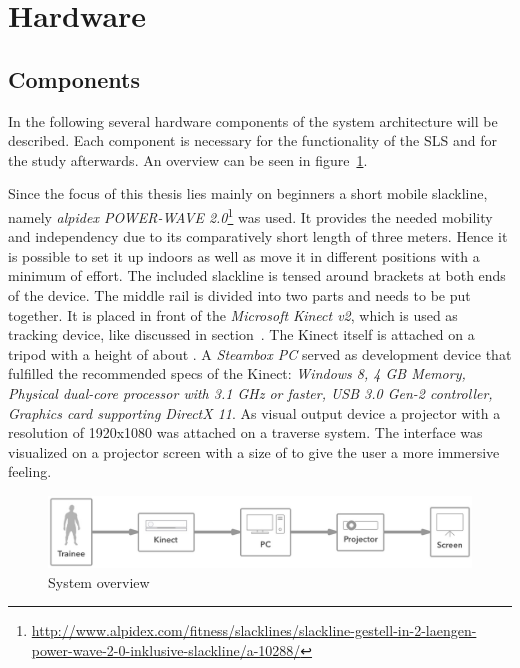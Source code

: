 \section{Hardware}\label{5_1_systemSetup}
\subsection{Components}\label{5_1_hardwareComponents}
In the following several hardware components of the system architecture will be described. Each component is necessary for the functionality of the SLS and for the study afterwards. An overview can be seen in figure~\ref{fig:5_3_systemArchitecture}.

Since the focus of this thesis lies mainly on beginners a short mobile slackline, namely \textit{alpidex POWER-WAVE 2.0}\footnote{\url{http://www.alpidex.com/fitness/slacklines/slackline-gestell-in-2-laengen-power-wave-2-0-inklusive-slackline/a-10288/}} was used.
It provides the needed mobility and independency due to its comparatively short length of three meters.
Hence it is possible to set it up indoors as well as move it in different positions with a minimum of effort.
The included slackline is tensed around brackets at both ends of the device.
The middle rail is divided into two parts and needs to be put together.
It is placed in front of the \textit{Microsoft Kinect v2}, which is used as tracking device, like discussed in section~\textit{}. The Kinect itself is attached on a  tripod with a height of about .
A \textit{Steambox PC}  served as development device that fulfilled the recommended specs of the Kinect: \textit{Windows 8, 4 GB Memory, Physical dual-core processor with 3.1 GHz or faster, USB 3.0 Gen-2 controller, Graphics card supporting DirectX 11}. As visual output device a projector  with a resolution of 1920x1080 was attached on a traverse system.
The interface was visualized on a projector screen with a size of  to give the user a more immersive feeling.

\begin{figure}[htb]
	\centering
	\begin{minipage}[t]{1\linewidth}
		\centering
		\includegraphics[width=1\linewidth]{Pictures/5_3_systemArchitecture}
		\caption{System overview}
		\label{fig:5_3_systemArchitecture}
	\end{minipage}
\end{figure}


